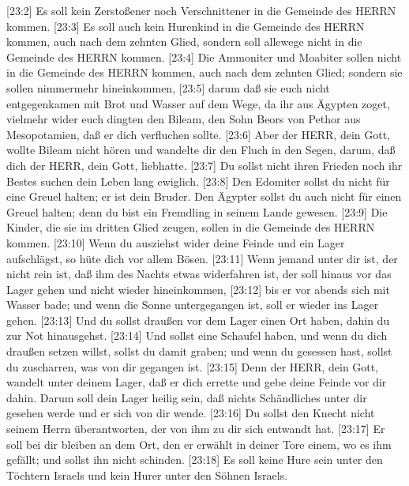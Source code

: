  {[}23:2{]} Es soll kein Zerstoßener noch Verschnittener in
die Gemeinde des HERRN kommen.  {[}23:3{]} Es soll auch kein
Hurenkind in die Gemeinde des HERRN kommen, auch nach dem zehnten Glied,
sondern soll allewege nicht in die Gemeinde des HERRN kommen.
 {[}23:4{]} Die Ammoniter und Moabiter sollen nicht in die
Gemeinde des HERRN kommen, auch nach dem zehnten Glied; sondern sie
sollen nimmermehr hineinkommen,  {[}23:5{]} darum daß sie
euch nicht entgegenkamen mit Brot und Wasser auf dem Wege, da ihr aus
Ägypten zoget, vielmehr wider euch dingten den Bileam, den Sohn Beors
von Pethor aus Mesopotamien, daß er dich verfluchen sollte. 
{[}23:6{]} Aber der HERR, dein Gott, wollte Bileam nicht hören und
wandelte dir den Fluch in den Segen, darum, daß dich der HERR, dein
Gott, liebhatte.  {[}23:7{]} Du sollst nicht ihren Frieden
noch ihr Bestes suchen dein Leben lang ewiglich.  {[}23:8{]}
Den Edomiter sollst du nicht für eine Greuel halten; er ist dein Bruder.
Den Ägypter sollst du auch nicht für einen Greuel halten; denn du bist
ein Fremdling in seinem Lande gewesen.  {[}23:9{]} Die
Kinder, die sie im dritten Glied zeugen, sollen in die Gemeinde des
HERRN kommen.  {[}23:10{]} Wenn du ausziehst wider deine
Feinde und ein Lager aufschlägst, so hüte dich vor allem Bösen.
 {[}23:11{]} Wenn jemand unter dir ist, der nicht rein ist,
daß ihm des Nachts etwas widerfahren ist, der soll hinaus vor das Lager
gehen und nicht wieder hineinkommen,  {[}23:12{]} bis er
vor abends sich mit Wasser bade; und wenn die Sonne untergegangen ist,
soll er wieder ins Lager gehen.  {[}23:13{]} Und du sollst
draußen vor dem Lager einen Ort haben, dahin du zur Not hinausgehst.
 {[}23:14{]} Und sollst eine Schaufel haben, und wenn du
dich draußen setzen willst, sollst du damit graben; und wenn du gesessen
hast, sollst du zuscharren, was von dir gegangen ist. 
{[}23:15{]} Denn der HERR, dein Gott, wandelt unter deinem Lager, daß er
dich errette und gebe deine Feinde vor dir dahin. Darum soll dein Lager
heilig sein, daß nichts Schändliches unter dir gesehen werde und er sich
von dir wende.  {[}23:16{]} Du sollst den Knecht nicht
seinem Herrn überantworten, der von ihm zu dir sich entwandt hat.
 {[}23:17{]} Er soll bei dir bleiben an dem Ort, den er
erwählt in deiner Tore einem, wo es ihm gefällt; und sollst ihn nicht
schinden.  {[}23:18{]} Es soll keine Hure sein unter den
Töchtern Israels und kein Hurer unter den Söhnen Israels. 

